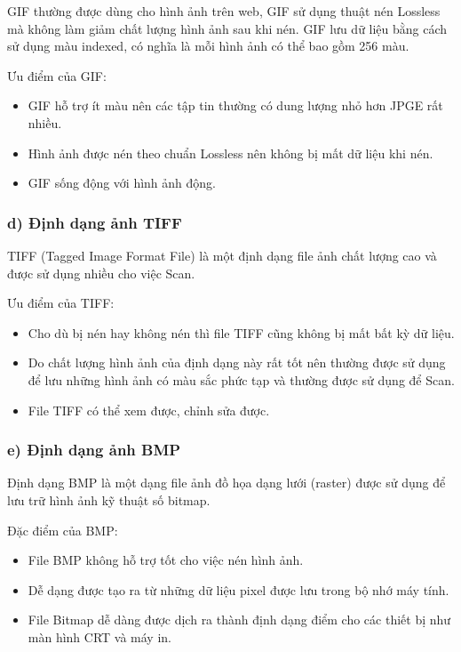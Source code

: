 \documentclass[a4paper,14pt]{extreport}
\begin{document}
GIF thường được dùng cho hình ảnh trên web, GIF sử dụng thuật nén Lossless mà không làm giảm chất lượng hình ảnh sau khi nén. GIF lưu dữ liệu bằng cách sử dụng màu indexed, có nghĩa là mỗi hình ảnh có thể bao gồm 256 màu.\cite{img-format}

Ưu điểm của GIF:

\begin{itemize}
    \item GIF hỗ trợ ít màu nên các tập tin thường có dung lượng nhỏ hơn JPGE rất nhiều.
    \item Hình ảnh được nén theo chuẩn Lossless nên không bị mất dữ liệu khi nén.
    \item GIF sống động với hình ảnh động.
\end{itemize}

\subsubsection*{d) Định dạng ảnh TIFF}

TIFF (Tagged Image Format File)  là một định dạng file ảnh chất lượng cao và được sử dụng nhiều cho việc Scan.\cite{img-format}

Ưu điểm của TIFF:

\begin{itemize}
    \item Cho dù bị nén hay không nén thì file TIFF cũng không bị mất bất kỳ dữ liệu.
    \item Do chất lượng hình ảnh của định dạng này rất tốt nên thường được sử dụng để lưu những hình ảnh có màu sắc phức tạp và thường được sử dụng để Scan.
    \item File TIFF có thể xem được, chỉnh sửa được.
\end{itemize}

\subsubsection*{e) Định dạng ảnh BMP}

Định dạng BMP là một dạng file ảnh đồ họa dạng lưới (raster) được sử dụng để lưu trữ hình ảnh kỹ thuật số bitmap.\cite{img-format} 

Đặc điểm của BMP:

\begin{itemize}
    \item File BMP không hỗ trợ tốt cho việc nén hình ảnh.
    \item Dễ dạng được tạo ra từ những dữ liệu pixel được lưu trong bộ nhớ máy tính.
    \item File Bitmap dễ dàng được dịch ra thành định dạng điểm cho các thiết bị như màn hình CRT và máy in.
\end{itemize}
\end{document}
